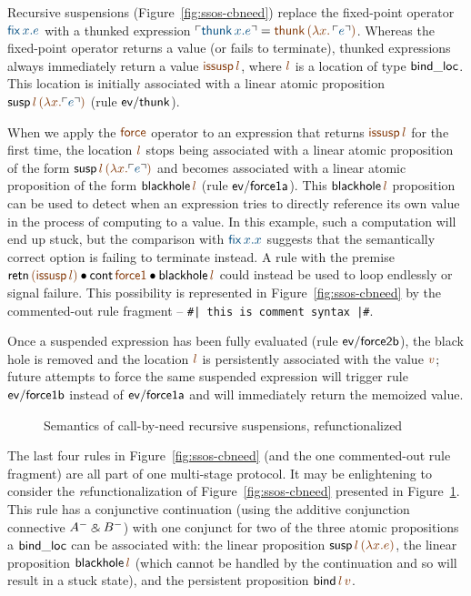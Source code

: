 Recursive suspensions (Figure~\ref{fig:ssos-cbneed}) replace the
fixed-point operator $\obj{{\sf fix}\,x.e}$ with a thunked expression
$\interp{{\sf thunk}\,x.e} = \lf{{\sf thunk}\,(\lambda
x.\,\interp{e})}$. Whereas the fixed-point operator returns a value (or
fails to terminate), thunked expressions always immediately return a
value $\lf{{\sf issusp}\,l}$, where $\lf{l}$ is a location of type ${\sf
  bind\_loc}$. This location is initially associated with a linear
atomic proposition ${\sf susp}\,\lf{l}\,\lf{(\lambda x.\interp{e})}$ 
(rule ${\sf
  ev/thunk}$).

When we apply the $\lf{\sf force}$ operator to an expression that
returns $\lf{{\sf issusp}\,l}$ for the first time, the location $\lf{l}$
stops being associated with a linear atomic proposition of the form
${\sf susp}\,\lf{l}\,\lf{(\lambda x.\interp{e})}$ and becomes
associated with a linear atomic proposition of the form ${\sf
  blackhole}\,\lf{l}$ (rule ${\sf ev/force1a}$). This ${\sf
  blackhole}\,\lf{l}$ proposition can be used to detect when an expression
tries to directly reference its own value in the process of computing
to a value. In this example, such a
computation will end up stuck, but the comparison with $\obj{{\sf fix}\,x.x}$ 
suggests that the semantically correct option is 
failing to terminate instead. A rule with the
premise ${\sf retn}\,\lf{({\sf issusp}\,l)} \fuse {\sf cont}\,\lf{\sf
  force1} \fuse {\sf blackhole}\,\lf{l}$ could instead be used to loop
endlessly or signal failure. This possibility is represented in
Figure~\ref{fig:ssos-cbneed} by the commented-out rule fragment --
\verb'#| this is comment syntax |#'.

Once a suspended expression has been fully evaluated (rule ${\sf ev/force2b}$),
the black hole is removed and the location $\lf{l}$ is persistently associated
with the value $\lf{v}$; future attempts to force the same suspended
expression will trigger rule ${\sf ev/force1b}$ instead of 
${\sf ev/force1a}$ and will immediately return the memoized value.

\begin{figure}[t]
\caption{Semantics of call-by-need recursive suspensions, refunctionalized}
\label{fig:ssos-cbneed-refun}
\end{figure}

The last four rules in Figure~\ref{fig:ssos-cbneed} (and the one
commented-out rule fragment) are all part of one multi-stage protocol.
It may be enlightening to consider the {\it re}functionalization of
Figure~\ref{fig:ssos-cbneed} presented in
Figure~\ref{fig:ssos-cbneed-refun}. This rule has a conjunctive
continuation (using the additive conjunction connective $A^- \mathbin{\binampersand}
B^-$) with one conjunct for two of the three atomic propositions a
${\sf bind\_loc}$ can be associated with: the linear proposition ${\sf
  susp}\,\lf{l}\,\lf{(\lambda x.e)}$, the linear proposition ${\sf
  blackhole}\,\lf{l}$ (which cannot be handled by the continuation and
so will result in a stuck state), and the persistent proposition ${\sf
  bind}\,\lf{l}\,\lf{v}$.


